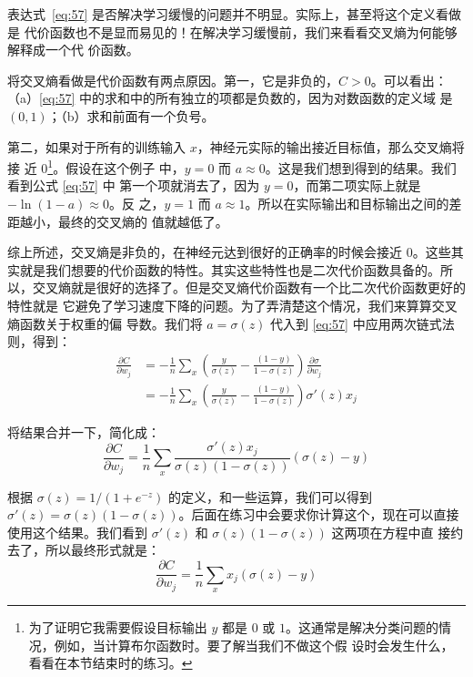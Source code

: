 表达式~\eqref{eq:57} 是否解决学习缓慢的问题并不明显。实际上，甚至将这个定义看做是
代价函数也不是显而易见的！在解决学习缓慢前，我们来看看交叉熵为何能够解释成一个代
价函数。

将交叉熵看做是代价函数有两点原因。第一，它是非负的，$C > 0$。可以看出：
（a）\eqref{eq:57} 中的求和中的所有独立的项都是负数的，因为对数函数的定义域
是 $(0,1)$；（b）求和前面有一个负号。

第二，如果对于所有的训练输入 $x$，神经元实际的输出接近目标值，那么交叉熵将接
近 $0$\footnote{为了证明它我需要假设目标输出 $y$ 都是 $0$ 或
  $1$。这通常是解决分类问题的情况，例如，当计算布尔函数时。要了解当我们不做这个假
  设时会发生什么，看看在本节结束时的练习。}。假设在这个例子
中，$y=0$ 而 $a\approx 0$。这是我们想到得到的结果。我们看到公式 \eqref{eq:57} 中
第一个项就消去了，因为 $y=0$，而第二项实际上就是 $-\ln (1-a)\approx 0$。反
之，$y=1$ 而 $a\approx 1$。所以在实际输出和目标输出之间的差距越小，最终的交叉熵的
值就越低了。

综上所述，交叉熵是非负的，在神经元达到很好的正确率的时候会接近
$0$。这些其实就是我们想要的代价函数的特性。其实这些特性也是二次代价函数具备的。所
以，交叉熵就是很好的选择了。但是交叉熵代价函数有一个比二次代价函数更好的特性就是
它避免了学习速度下降的问题。为了弄清楚这个情况，我们来算算交叉熵函数关于权重的偏
导数。我们将 $a=\sigma(z)$ 代入到 \eqref{eq:57} 中应用两次链式法则，得到：
\begin{align}
  \frac{\partial C}{\partial w_j} &= -\frac{1}{n} \sum_x \left(
                                    \frac{y }{\sigma(z)} -\frac{(1-y)}{1-\sigma(z)} \right)
                                    \frac{\partial \sigma}{\partial w_j} \label{eq:58}\tag{58}\\
                                  &= -\frac{1}{n} \sum_x \left( 
                                    \frac{y}{\sigma(z)} 
                                    -\frac{(1-y)}{1-\sigma(z)} \right)\sigma'(z) x_j \label{eq:59}\tag{59}
\end{align}

将结果合并一下，简化成：
\begin{equation}
  \frac{\partial C}{\partial w_j} = \frac{1}{n}
  \sum_x \frac{\sigma'(z) x_j}{\sigma(z) (1-\sigma(z))}
  (\sigma(z)-y)
\label{eq:60}\tag{60}
\end{equation}

根据 $\sigma(z) = 1/(1+e^{-z})$ 的定义，和一些运算，我们可以得到
$\sigma'(z) = \sigma(z)(1-\sigma(z))$。后面在练习中会要求你计算这个，现在可以直接
使用这个结果。我们看到 $\sigma'(z)$ 和 $\sigma(z)(1-\sigma(z))$ 这两项在方程中直
接约去了，所以最终形式就是：
\begin{equation}
  \frac{\partial C}{\partial w_j} =  \frac{1}{n} \sum_x x_j(\sigma(z)-y)
\label{eq:61}\tag{61}
\end{equation}

